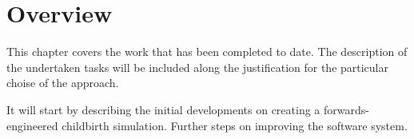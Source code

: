 \section{Overview}\label{work-overview}

This chapter covers the work that has been completed to date. The description of the undertaken tasks will be included along the justification for the particular choise of the approach.

It will start by describing the initial developments on creating a forwards-engineered childbirth simulation. Further steps on improving the software system.
